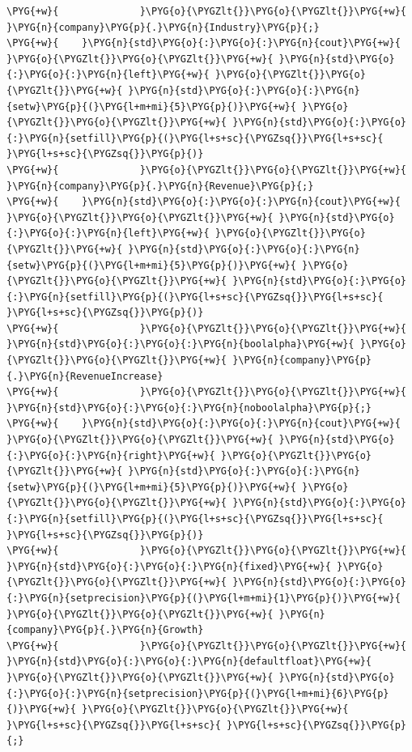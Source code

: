 \begin{itemize}
\begin{codeblockbg}
\begin{Verbatim}[commandchars=\\\{\},breaklines=true,breakanywhere=true,fontsize=\codefont,xleftmargin=17bp]
\PYG{+w}{              }\PYG{o}{\PYGZlt{}}\PYG{o}{\PYGZlt{}}\PYG{+w}{ }\PYG{n}{company}\PYG{p}{.}\PYG{n}{Industry}\PYG{p}{;}
\PYG{+w}{    }\PYG{n}{std}\PYG{o}{:}\PYG{o}{:}\PYG{n}{cout}\PYG{+w}{ }\PYG{o}{\PYGZlt{}}\PYG{o}{\PYGZlt{}}\PYG{+w}{ }\PYG{n}{std}\PYG{o}{:}\PYG{o}{:}\PYG{n}{left}\PYG{+w}{ }\PYG{o}{\PYGZlt{}}\PYG{o}{\PYGZlt{}}\PYG{+w}{ }\PYG{n}{std}\PYG{o}{:}\PYG{o}{:}\PYG{n}{setw}\PYG{p}{(}\PYG{l+m+mi}{5}\PYG{p}{)}\PYG{+w}{ }\PYG{o}{\PYGZlt{}}\PYG{o}{\PYGZlt{}}\PYG{+w}{ }\PYG{n}{std}\PYG{o}{:}\PYG{o}{:}\PYG{n}{setfill}\PYG{p}{(}\PYG{l+s+sc}{\PYGZsq{}}\PYG{l+s+sc}{ }\PYG{l+s+sc}{\PYGZsq{}}\PYG{p}{)}
\PYG{+w}{              }\PYG{o}{\PYGZlt{}}\PYG{o}{\PYGZlt{}}\PYG{+w}{ }\PYG{n}{company}\PYG{p}{.}\PYG{n}{Revenue}\PYG{p}{;}
\PYG{+w}{    }\PYG{n}{std}\PYG{o}{:}\PYG{o}{:}\PYG{n}{cout}\PYG{+w}{ }\PYG{o}{\PYGZlt{}}\PYG{o}{\PYGZlt{}}\PYG{+w}{ }\PYG{n}{std}\PYG{o}{:}\PYG{o}{:}\PYG{n}{left}\PYG{+w}{ }\PYG{o}{\PYGZlt{}}\PYG{o}{\PYGZlt{}}\PYG{+w}{ }\PYG{n}{std}\PYG{o}{:}\PYG{o}{:}\PYG{n}{setw}\PYG{p}{(}\PYG{l+m+mi}{5}\PYG{p}{)}\PYG{+w}{ }\PYG{o}{\PYGZlt{}}\PYG{o}{\PYGZlt{}}\PYG{+w}{ }\PYG{n}{std}\PYG{o}{:}\PYG{o}{:}\PYG{n}{setfill}\PYG{p}{(}\PYG{l+s+sc}{\PYGZsq{}}\PYG{l+s+sc}{ }\PYG{l+s+sc}{\PYGZsq{}}\PYG{p}{)}
\PYG{+w}{              }\PYG{o}{\PYGZlt{}}\PYG{o}{\PYGZlt{}}\PYG{+w}{ }\PYG{n}{std}\PYG{o}{:}\PYG{o}{:}\PYG{n}{boolalpha}\PYG{+w}{ }\PYG{o}{\PYGZlt{}}\PYG{o}{\PYGZlt{}}\PYG{+w}{ }\PYG{n}{company}\PYG{p}{.}\PYG{n}{RevenueIncrease}
\PYG{+w}{              }\PYG{o}{\PYGZlt{}}\PYG{o}{\PYGZlt{}}\PYG{+w}{ }\PYG{n}{std}\PYG{o}{:}\PYG{o}{:}\PYG{n}{noboolalpha}\PYG{p}{;}
\PYG{+w}{    }\PYG{n}{std}\PYG{o}{:}\PYG{o}{:}\PYG{n}{cout}\PYG{+w}{ }\PYG{o}{\PYGZlt{}}\PYG{o}{\PYGZlt{}}\PYG{+w}{ }\PYG{n}{std}\PYG{o}{:}\PYG{o}{:}\PYG{n}{right}\PYG{+w}{ }\PYG{o}{\PYGZlt{}}\PYG{o}{\PYGZlt{}}\PYG{+w}{ }\PYG{n}{std}\PYG{o}{:}\PYG{o}{:}\PYG{n}{setw}\PYG{p}{(}\PYG{l+m+mi}{5}\PYG{p}{)}\PYG{+w}{ }\PYG{o}{\PYGZlt{}}\PYG{o}{\PYGZlt{}}\PYG{+w}{ }\PYG{n}{std}\PYG{o}{:}\PYG{o}{:}\PYG{n}{setfill}\PYG{p}{(}\PYG{l+s+sc}{\PYGZsq{}}\PYG{l+s+sc}{ }\PYG{l+s+sc}{\PYGZsq{}}\PYG{p}{)}
\PYG{+w}{              }\PYG{o}{\PYGZlt{}}\PYG{o}{\PYGZlt{}}\PYG{+w}{ }\PYG{n}{std}\PYG{o}{:}\PYG{o}{:}\PYG{n}{fixed}\PYG{+w}{ }\PYG{o}{\PYGZlt{}}\PYG{o}{\PYGZlt{}}\PYG{+w}{ }\PYG{n}{std}\PYG{o}{:}\PYG{o}{:}\PYG{n}{setprecision}\PYG{p}{(}\PYG{l+m+mi}{1}\PYG{p}{)}\PYG{+w}{ }\PYG{o}{\PYGZlt{}}\PYG{o}{\PYGZlt{}}\PYG{+w}{ }\PYG{n}{company}\PYG{p}{.}\PYG{n}{Growth}
\PYG{+w}{              }\PYG{o}{\PYGZlt{}}\PYG{o}{\PYGZlt{}}\PYG{+w}{ }\PYG{n}{std}\PYG{o}{:}\PYG{o}{:}\PYG{n}{defaultfloat}\PYG{+w}{ }\PYG{o}{\PYGZlt{}}\PYG{o}{\PYGZlt{}}\PYG{+w}{ }\PYG{n}{std}\PYG{o}{:}\PYG{o}{:}\PYG{n}{setprecision}\PYG{p}{(}\PYG{l+m+mi}{6}\PYG{p}{)}\PYG{+w}{ }\PYG{o}{\PYGZlt{}}\PYG{o}{\PYGZlt{}}\PYG{+w}{ }\PYG{l+s+sc}{\PYGZsq{}}\PYG{l+s+sc}{ }\PYG{l+s+sc}{\PYGZsq{}}\PYG{p}{;}

\end{Verbatim}
\end{codeblockbg}
\end{itemize}
